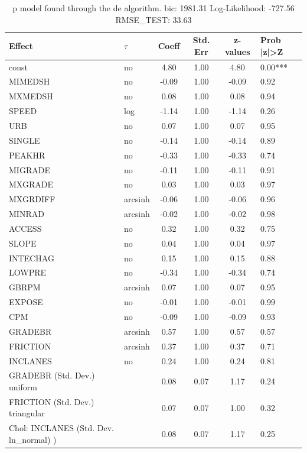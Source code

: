\begin{table}
	\caption{p model found through the de algorithm. bic: 1981.31 Log-Likelihood: -727.56 RMSE_TEST: 33.63}
	\begin{center}
		\begin{tabular}{|l|l|c|c|c|l|}
			\hline
			Effect & $\tau$ & Coeff & Std. Err & z-values & Prob |z|>Z \\
			\hline
			const & no & 4.80 & 1.00 & 4.80 & 0.00*** \\
			\hline
			MIMEDSH & no & -0.09 & 1.00 & -0.09 & 0.92 \\
			\hline
			MXMEDSH & no & 0.08 & 1.00 & 0.08 & 0.94 \\
			\hline
			SPEED & log & -1.14 & 1.00 & -1.14 & 0.26 \\
			\hline
			URB & no & 0.07 & 1.00 & 0.07 & 0.95 \\
			\hline
			SINGLE & no & -0.14 & 1.00 & -0.14 & 0.89 \\
			\hline
			PEAKHR & no & -0.33 & 1.00 & -0.33 & 0.74 \\
			\hline
			MIGRADE & no & -0.11 & 1.00 & -0.11 & 0.91 \\
			\hline
			MXGRADE & no & 0.03 & 1.00 & 0.03 & 0.97 \\
			\hline
			MXGRDIFF & arcsinh & -0.06 & 1.00 & -0.06 & 0.96 \\
			\hline
			MINRAD & arcsinh & -0.02 & 1.00 & -0.02 & 0.98 \\
			\hline
			ACCESS & no & 0.32 & 1.00 & 0.32 & 0.75 \\
			\hline
			SLOPE & no & 0.04 & 1.00 & 0.04 & 0.97 \\
			\hline
			INTECHAG & no & 0.15 & 1.00 & 0.15 & 0.88 \\
			\hline
			LOWPRE & no & -0.34 & 1.00 & -0.34 & 0.74 \\
			\hline
			GBRPM & arcsinh & 0.07 & 1.00 & 0.07 & 0.95 \\
			\hline
			EXPOSE & no & -0.01 & 1.00 & -0.01 & 0.99 \\
			\hline
			CPM & no & -0.09 & 1.00 & -0.09 & 0.93 \\
			\hline
			GRADEBR & arcsinh & 0.57 & 1.00 & 0.57 & 0.57 \\
			\hline
			FRICTION & arcsinh & 0.37 & 1.00 & 0.37 & 0.71 \\
			\hline
			INCLANES & no & 0.24 & 1.00 & 0.24 & 0.81 \\
			\hline
			GRADEBR (Std. Dev.) uniform &  & 0.08 & 0.07 & 1.17 & 0.24 \\
			\hline
			FRICTION (Std. Dev.) triangular &  & 0.07 & 0.07 & 1.00 & 0.32 \\
			\hline
			 Chol: INCLANES (Std. Dev. ln_normal) ) &  & 0.08 & 0.07 & 1.17 & 0.25 \\
			\hline
		\end{tabular}
	\end{center}
\end{table}